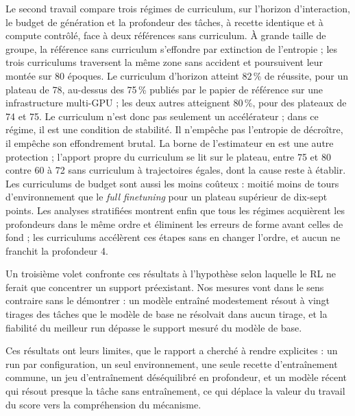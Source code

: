 \documentclass[11pt,a4paper]{article}
\begin{document}
Le second travail compare trois régimes de curriculum, sur l'horizon d'interaction, le budget de génération et la profondeur des tâches, à recette identique et à compute contrôlé, face à deux références sans curriculum. À grande taille de groupe, la référence sans curriculum s'effondre par extinction de l'entropie ; les trois curriculums traversent la même zone sans accident et poursuivent leur montée sur 80 époques. Le curriculum d'horizon atteint 82\,\% de réussite, pour un plateau de 78, au-dessus des 75\,\% publiés par le papier de référence sur une infrastructure multi-GPU ; les deux autres atteignent 80\,\%, pour des plateaux de 74 et 75. Le curriculum n'est donc pas seulement un accélérateur ; dans ce régime, il est une condition de stabilité. Il n'empêche pas l'entropie de décroître, il empêche son effondrement brutal. La borne de l'estimateur en est une autre protection ; l'apport propre du curriculum se lit sur le plateau, entre 75 et 80 contre 60 à 72 sans curriculum à trajectoires égales, dont la cause reste à établir. Les curriculums de budget sont aussi les moins coûteux : moitié moins de tours d'environnement que le \emph{full finetuning} pour un plateau supérieur de dix-sept points. Les analyses stratifiées montrent enfin que tous les régimes acquièrent les profondeurs dans le même ordre et éliminent les erreurs de forme avant celles de fond ; les curriculums accélèrent ces étapes sans en changer l'ordre, et aucun ne franchit la profondeur 4.

Un troisième volet confronte ces résultats à l'hypothèse selon laquelle le RL ne ferait que concentrer un support préexistant. Nos mesures vont dans le sens contraire sans le démontrer : un modèle entraîné modestement résout à vingt tirages des tâches que le modèle de base ne résolvait dans aucun tirage, et la fiabilité du meilleur run dépasse le support mesuré du modèle de base. 

Ces résultats ont leurs limites, que le rapport a cherché à rendre explicites : un run par configuration, un seul environnement, une seule recette d'entraînement commune, un jeu d'entraînement déséquilibré en profondeur, et un modèle récent qui résout presque la tâche sans entraînement, ce qui déplace la valeur du travail du score vers la compréhension du mécanisme.
\end{document}
